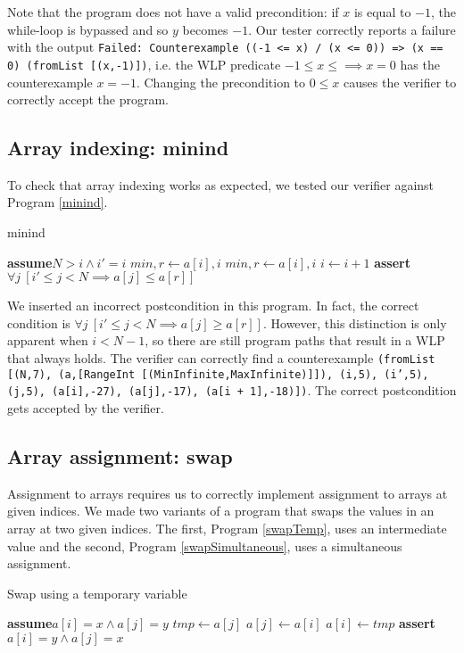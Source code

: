\documentclass[a4paper]{article}
\newcommand{\Assert}{\State\textbf{assert}\xspace}
\newcommand{\Assume}{\State\textbf{assume}\xspace}
\begin{document}
Note that the program does not have a valid precondition: if $x$ is equal to $-1$, the while-loop is bypassed and so $y$ becomes $-1$. Our tester correctly reports a failure with the output \texttt{Failed: Counterexample ((-1 <= x) /\ (x <= 0)) => (x == 0) (fromList [(x,-1)])}, i.e. the WLP predicate $-1 \leq x \leq \implies x = 0$ has the counterexample $x = -1$. Changing the precondition to $0 \leq x$ causes the verifier to correctly accept the program.

\subsection{Array indexing: minind}

To check that array indexing works as expected, we tested our verifier against Program \ref{minind}.
\begin{algorithm}\label{minind}
\caption{minind}
\begin{algorithmic}
\Assume $N > i \wedge i' = i$
	\State $\textit{min}, r \gets a[i], i$
			\State $\textit{min}, r \gets a[i], i$
		\EndIf
		\State $i \gets i+1$
	\EndWhile
\EndVar
\Assert $\forall j\ [i' \leq j < N \implies a[j] \leq a[r]]$
\end{algorithmic}
\end{algorithm}

We inserted an incorrect postcondition in this program. In fact, the correct condition is $\forall j\ [i' \leq j < N \implies a[j] \geq a[r]]$. However, this distinction is only apparent when $i < N - 1$, so there are still program paths that result in a WLP that always holds. The verifier can correctly find a counterexample \texttt{(fromList [(N,7), (a,[RangeInt [(MinInfinite,MaxInfinite)]]), (i,5), (i',5), (j,5), (a[i],-27), (a[j],-17), (a[i + 1],-18)])}. The correct postcondition gets accepted by the verifier.

\subsection{Array assignment: swap}

Assignment to arrays requires us to correctly implement assignment to arrays at given indices. We made two variants of a program that swaps the values in an array at two given indices. The first, Program \ref{swapTemp}, uses an intermediate value and the second, Program \ref{swapSimultaneous}, uses a simultaneous assignment.

\begin{algorithm}\label{swapTemp}
\caption{Swap using a temporary variable}
\begin{algorithmic}
\Assume $a[i] = x \wedge a[j] = y$
\State $\textit{tmp} \gets a[j]$
\State $a[j] \gets a[i]$
\State $a[i] \gets \textit{tmp}$
\EndVar
\Assert $a[i] = y \wedge a[j] = x$
\end{algorithmic}
\end{algorithm}
\end{document}
